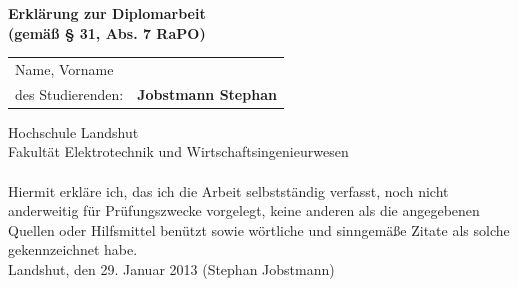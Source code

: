 \documentclass[12pt]{scrreprt} %
\begin{document}
\begin{center}
\vspace*{1.5cm}
 \Large \bfseries Erklärung zur Diplomarbeit\\
(gemäß § 31, Abs. 7 RaPO)
\end{center}
\vspace*{3 cm}
\begin{table}[h]
	\centering
	\begin{tabular}{l l}
		Name, Vorname  &\\
		des Studierenden: & \textbf{Jobstmann Stephan}
	\end{tabular}
\end{table}
\vspace*{3 cm}
Hochschule Landshut\\
Fakultät Elektrotechnik und Wirtschaftsingenieurwesen\\
\vspace*{1,5 cm}
\\
Hiermit erkläre ich, das ich die Arbeit selbstständig verfasst, noch nicht anderweitig für Prüfungszwecke vorgelegt, keine anderen als die angegebenen Quellen oder Hilfsmittel benützt sowie wörtliche und sinngemäße Zitate als solche gekennzeichnet habe.
\vspace*{2 cm}
\\
Landshut, den  29. Januar 2013 \qquad \qquad \qquad  \qquad \qquad (Stephan Jobstmann)
\end{document}
